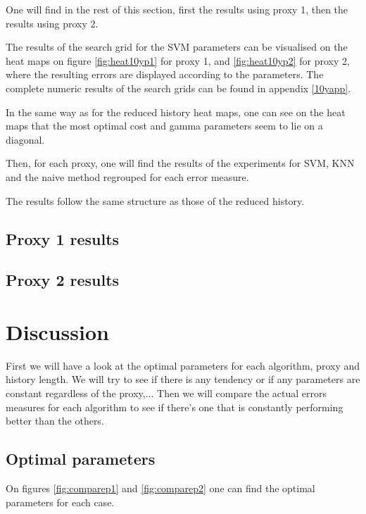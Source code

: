 \documentclass[11pt,a4paper,oneside]{book}
\begin{document}
One will find in the rest of this section, first the results using proxy 1, then the results using proxy 2.

The results of the search grid for the SVM parameters can be visualised on the heat maps on figure \ref{fig:heat10yp1} for proxy 1, and \ref{fig:heat10yp2} for proxy 2, where the resulting errors are displayed according to the parameters. The complete numeric results of the search grids can be found in appendix \ref{10yapp}. 

In the same way as for the reduced history heat maps, one can see on the heat maps that the most optimal cost and gamma parameters seem to lie on a diagonal.

Then, for each proxy, one will find the results of the experiments for SVM, KNN and the naive method regrouped for each error measure.

The results follow the same structure as those of the reduced history.



\clearpage


\clearpage
\subsection{Proxy 1 results}



\clearpage


\clearpage
\subsection{Proxy 2 results}




\clearpage
\section{Discussion}


First we will have a look at the optimal parameters for each algorithm, proxy and history length. We will try to see if there is any tendency or if any parameters are constant regardless of the proxy,... Then we will compare the actual errors measures for each algorithm to see if there's one that is constantly performing better than the others.

\subsection{Optimal parameters}
On figures \ref{fig:comparep1} and \ref{fig:comparep2} one can find the optimal parameters for each case. 
\end{document}
